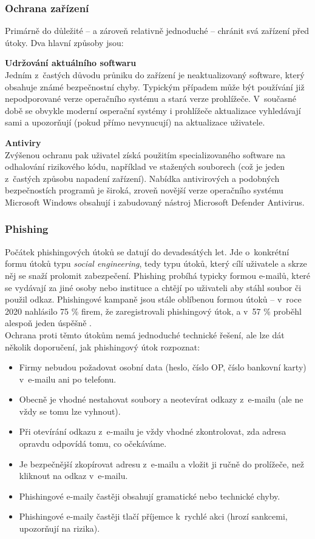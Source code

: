 \subsubsection*{Ochrana zařízení}
Primárně do důležité -- a zároveň relativně jednoduché -- chránit svá zařízení před útoky. Dva hlavní způsoby jsou:

\textbf{Udržování aktuálního softwaru}\\
Jedním z~častých důvodu průniku do zařízení je neaktualizovaný software, který obsahuje známé bezpečnostní chyby. Typickým případem může být používání již nepodporované verze operačního systému a stará verze prohlížeče. V~současné době se obvykle moderní osperační systémy i prohlížeče aktualizace vyhledávají sami a upozorňují (pokud přímo nevynucují) na aktualizace uživatele.


\textbf{Antiviry}\\
Zvýšenou ochranu pak uživatel získá použitím specializovaného software na odhalování rizikového kódu, například ve stažených souborech (což je jeden z~častých způsobu napadení zařízení). Nabídka antivirových a podobných bezpečnostích programů je široká, zroveň novější verze operačního systému Microsoft Windows obsahují i zabudovaný nástroj Microsoft Defender Antivirus.

\subsubsection*{Phishing}
Počátek phishingových útoků se datují do devadesátých let. Jde o~konkrétní formu útoků typu \textit{social engineering}, tedy typu útoků, který cílí uživatele a skrze něj se snaží prolomit zabezpečení. Phishing probíhá typicky formou e-mailů, které se vydávají za jiné osoby nebo instituce a chtějí po uživateli aby stáhl soubor či použil odkaz. Phishingové kampaně jsou stále oblíbenou formou útoků -- v~roce 2020 nahlásilo 75 \% firem, že zaregistrovali phishingový útok, a v~57 \% proběhl alespoň jeden úspěšně \citep{phishing-success}.\\
Ochrana proti těmto útokům nemá jednoduché technické řešení, ale lze dát několik doporučení, jak phishingový útok rozpoznat:
\begin{itemize}
	\item Firmy nebudou požadovat osobní data (heslo, číslo OP, číslo bankovní karty) v~e-mailu ani po telefonu.
	\item Obecně je vhodné nestahovat soubory a neotevírat odkazy z~e-mailu (ale ne vždy se tomu lze vyhnout).
	\item Při otevírání odkazu z~e-mailu je vždy vhodné zkontrolovat, zda adresa opravdu odpovídá tomu, co očekáváme.
	\item Je bezpečnější zkopírovat adresu z~e-mailu a vložit ji ručně do prolížeče, než kliknout na odkaz v~e-mailu.
	\item Phishingové e-maily častěji obsahují gramatické nebo technické chyby.
	\item Phishingové e-maily častěji tlačí příjemce k~rychlé akci (hrozí sankcemi, upozorňují na rizika).
\end{itemize}


